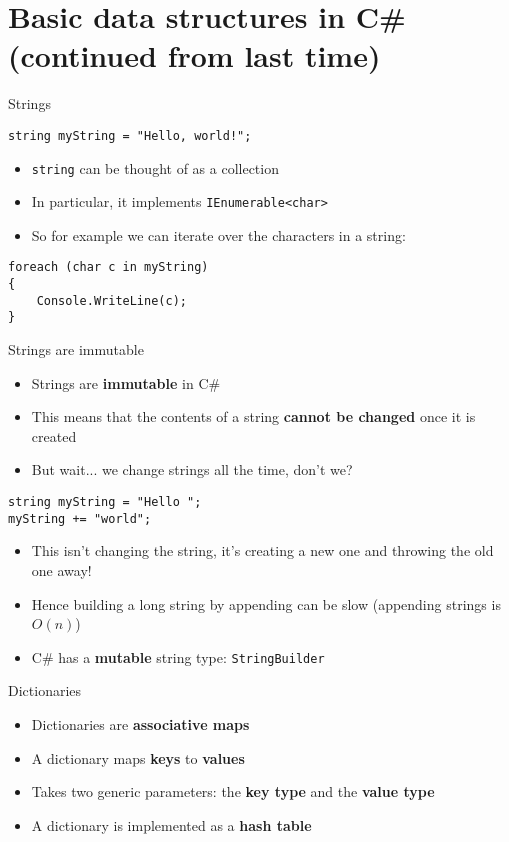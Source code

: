 \part{Basic data structures in C\# (continued from last time)}
\frame{\partpage}

\begin{frame}[fragile]{Strings}
    \begin{lstlisting}
string myString = "Hello, world!";
    \end{lstlisting}
	\begin{itemize}
		\pause\item \lstinline{string} can be thought of as a collection
		\pause\item In particular, it implements \lstinline{IEnumerable<char>}
		\pause\item So for example we can iterate over the characters in a string:
	\end{itemize}
    \begin{lstlisting}
foreach (char c in myString)
{
	Console.WriteLine(c);
}
	\end{lstlisting}
\end{frame}

\begin{frame}[fragile]{Strings are immutable}
	\begin{itemize}
		\pause\item Strings are \textbf{immutable} in C\#
		\pause\item This means that the contents of a string \textbf{cannot be changed} once it is created
		\pause\item But wait... we change strings all the time, don't we?
	\end{itemize}
	\begin{lstlisting}
string myString = "Hello ";
myString += "world";
	\end{lstlisting}
	\begin{itemize}
		\pause\item This isn't changing the string, it's creating a new one and throwing the old one away!
		\pause\item Hence building a long string by appending can be slow (appending strings is $O(n)$)
		\pause\item C\# has a \textbf{mutable} string type: \lstinline{StringBuilder}
	\end{itemize}
\end{frame}

\begin{frame}{Dictionaries}
	\begin{itemize}
		\pause\item Dictionaries are \textbf{associative maps}
		\pause\item A dictionary maps \textbf{keys} to \textbf{values}
		\pause\item Takes two generic parameters: the \textbf{key type} and the \textbf{value type}
		\pause\item A dictionary is implemented as a \textbf{hash table}
	\end{itemize}		
\end{frame}

